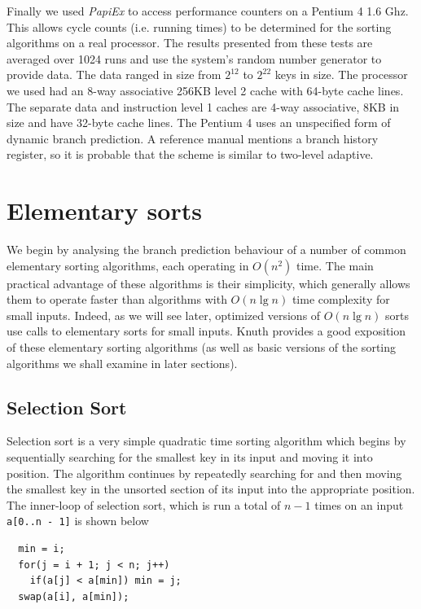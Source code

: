 \documentclass[acmtocl]{acmtrans2m}
\begin{document}
Finally we used \textit{PapiEx} \cite{PapiExManual} to access performance counters on a Pentium 4 1.6 Ghz. This allows cycle counts (i.e. running times)
to be
determined for the sorting algorithms on a real processor.
The results presented from these tests are averaged over 1024 runs and use the system's random number generator to provide data. The data
ranged in size from $2^{12}$ to $2^{22}$ keys in size.
The processor we used had an 8-way associative 256KB level 2 
cache with 64-byte cache lines. The separate data and instruction level 1 caches are 4-way associative, 8KB in size and have 32-byte cache lines.
The Pentium 4 uses an unspecified form of dynamic branch prediction. A reference manual \cite{Intel248966-010} mentions a branch history
register, so it is probable that the scheme is similar to two-level adaptive.


\section{Elementary sorts}

We begin by analysing the branch prediction behaviour of a number
of common elementary sorting algorithms, each operating in
$O(n^2)$ time. The main practical advantage of these
algorithms is their simplicity, which generally allows them to
operate faster than algorithms with $O(n \lg n)$ time complexity
for small inputs. Indeed, as we will see later, optimized versions
of $O(n \lg n)$ sorts use calls to elementary sorts for small inputs.
Knuth \citeyear{KnuthVol3_98} provides a good exposition of these elementary
sorting algorithms (as well as basic versions of the sorting algorithms
we shall examine in later sections).

\subsection{Selection Sort}
\label{selection_sort}

Selection sort is a very simple quadratic time sorting algorithm which begins by sequentially searching
for the smallest key in its input and moving it into position. The algorithm 
continues by repeatedly searching for and then moving the smallest key in the unsorted
section of its input into the appropriate position. The inner-loop of selection sort,
which is run a total of $n - 1$ times on an input \texttt{a[0..n - 1]} is shown below

\begin{verbatim}
  min = i;
  for(j = i + 1; j < n; j++)
    if(a[j] < a[min]) min = j;
  swap(a[i], a[min]);
\end{verbatim}
\end{document}
